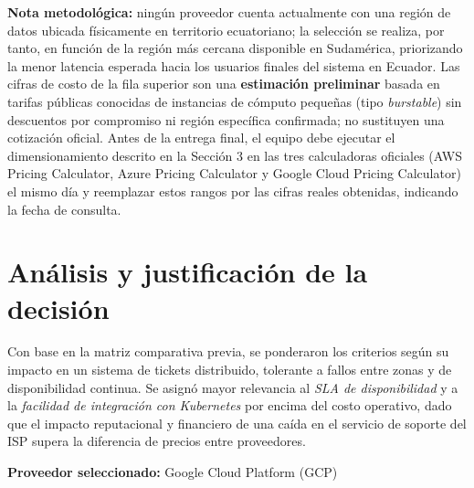 \documentclass[12pt, a4paper]{article}
\begin{document}
\textbf{Nota metodológica:} ningún proveedor cuenta actualmente con una región de datos ubicada físicamente en territorio ecuatoriano; la selección se realiza, por tanto, en función de la región más cercana disponible en Sudamérica, priorizando la menor latencia esperada hacia los usuarios finales del sistema en Ecuador. Las cifras de costo de la fila superior son una \textbf{estimación preliminar} basada en tarifas públicas conocidas de instancias de cómputo pequeñas (tipo \textit{burstable}) sin descuentos por compromiso ni región específica confirmada; no sustituyen una cotización oficial. Antes de la entrega final, el equipo debe ejecutar el dimensionamiento descrito en la Sección 3 en las tres calculadoras oficiales (AWS Pricing Calculator, Azure Pricing Calculator y Google Cloud Pricing Calculator) el mismo día y reemplazar estos rangos por las cifras reales obtenidas, indicando la fecha de consulta.

\section{Análisis y justificación de la decisión}

Con base en la matriz comparativa previa, se ponderaron los criterios según su impacto en un sistema de tickets distribuido, tolerante a fallos entre zonas y de disponibilidad continua. Se asignó mayor relevancia al \emph{SLA de disponibilidad} y a la \emph{facilidad de integración con Kubernetes} por encima del costo operativo, dado que el impacto reputacional y financiero de una caída en el servicio de soporte del ISP supera la diferencia de precios entre proveedores.

\vspace{4pt}
\noindent\textbf{Proveedor seleccionado:} Google Cloud Platform (GCP)
\end{document}

